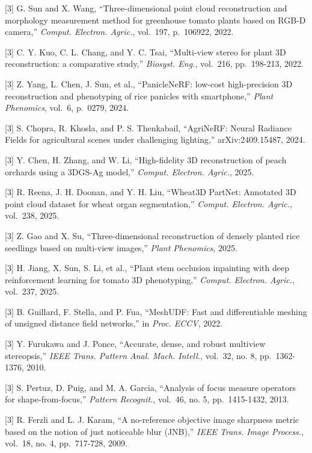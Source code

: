 \documentclass[11pt,a4paper]{article}
\begin{document}
{[}3{]} G. Sun and X. Wang, ``Three-dimensional point cloud
reconstruction and morphology measurement method for greenhouse tomato
plants based on RGB-D camera,'' \emph{Comput. Electron. Agric.},
vol.~197, p.~106922, 2022.

{[}3{]} C. Y. Kuo, C. L. Chang, and Y. C. Tsai, ``Multi-view stereo for
plant 3D reconstruction: a comparative study,'' \emph{Biosyst. Eng.},
vol.~216, pp.~198-213, 2022.

{[}3{]} Z. Yang, L. Chen, J. Sun, et al., ``PanicleNeRF: low-cost
high-precision 3D reconstruction and phenotyping of rice panicles with
smartphone,'' \emph{Plant Phenomics}, vol.~6, p.~0279, 2024.

{[}3{]} S. Chopra, R. Khosla, and P. S. Thenkabail, ``AgriNeRF: Neural
Radiance Fields for agricultural scenes under challenging lighting,''
arXiv:2409.15487, 2024.

{[}3{]} Y. Chen, H. Zhang, and W. Li, ``High-fidelity 3D reconstruction
of peach orchards using a 3DGS-Ag model,'' \emph{Comput. Electron.
Agric.}, 2025.

{[}3{]} R. Reena, J. H. Doonan, and Y. H. Liu, ``Wheat3D PartNet:
Annotated 3D point cloud dataset for wheat organ segmentation,''
\emph{Comput. Electron. Agric.}, vol.~238, 2025.

{[}3{]} Z. Gao and X. Su, ``Three-dimensional reconstruction of densely
planted rice seedlings based on multi-view images,'' \emph{Plant
Phenomics}, 2025.

{[}3{]} H. Jiang, X. Sun, S. Li, et al., ``Plant stem occlusion
inpainting with deep reinforcement learning for tomato 3D phenotyping,''
\emph{Comput. Electron. Agric.}, vol.~237, 2025.

{[}3{]} B. Guillard, F. Stella, and P. Fua, ``MeshUDF: Fast and
differentiable meshing of unsigned distance field networks,'' in
\emph{Proc. ECCV}, 2022.

{[}3{]} Y. Furukawa and J. Ponce, ``Accurate, dense, and robust
multiview stereopsis,'' \emph{IEEE Trans. Pattern Anal. Mach. Intell.},
vol.~32, no. 8, pp.~1362-1376, 2010.

{[}3{]} S. Pertuz, D. Puig, and M. A. Garcia, ``Analysis of focus
measure operators for shape-from-focus,'' \emph{Pattern Recognit.},
vol.~46, no. 5, pp.~1415-1432, 2013.

{[}3{]} R. Ferzli and L. J. Karam, ``A no-reference objective image
sharpness metric based on the notion of just noticeable blur (JNB),''
\emph{IEEE Trans. Image Process.}, vol.~18, no. 4, pp.~717-728, 2009.
\end{document}
